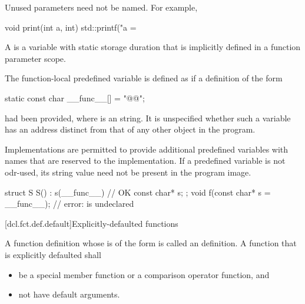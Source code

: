 \pnum
\begin{note}
Unused parameters need not be named.
For example,

\begin{codeblock}
void print(int a, int) {
  std::printf("a = %
}
\end{codeblock}
\end{note}

\pnum
A  is a variable with static
storage duration that is implicitly defined in a function parameter scope.

\pnum
{}%
The function-local predefined variable  is
defined as if a definition of the form
\begin{codeblock}
static const char __func__[] = "@@";
\end{codeblock}
had been provided, where  is an  string.
It is unspecified whether such a variable has an address
distinct from that of any other object in the program.
\begin{footnote}
Implementations are
permitted to provide additional predefined variables with names that are reserved to the
implementation. If a predefined variable is not
odr-used, its string value need not be present in the program image.
\end{footnote}
\begin{example}
\begin{codeblock}
struct S {
  S() : s(__func__) { }             // OK
  const char* s;
};
void f(const char* s = __func__);   // error:  is undeclared
\end{codeblock}
\end{example}

[dcl.fct.def.default]{Explicitly-defaulted functions}%

\pnum
A function definition whose
is of the form
is called an  definition.
A function that is explicitly defaulted shall
\begin{itemize}
\item be a special member function or
a comparison operator function, and
\item not have default arguments.
\end{itemize}

